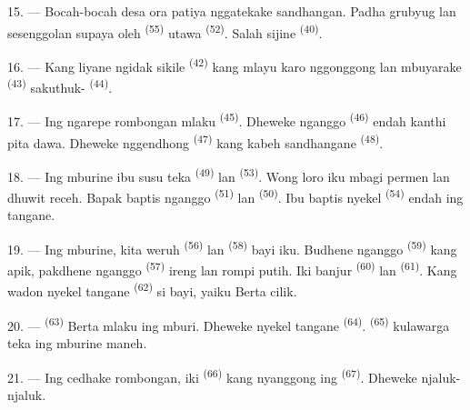 15. --- Bocah-bocah desa ora patiya nggatekake sandhangan. Padha
grubyug lan sesenggolan supaya oleh 
\textsuperscript{(55)} utawa  \textsuperscript{(52)}.
Salah sijine  \textsuperscript{(40)}.

16. --- Kang liyane ngidak sikile  \textsuperscript{(42)}
kang mlayu karo nggonggong lan mbuyarake 
\textsuperscript{(43)} sakuthuk- \textsuperscript{(44)}.

\VUsaut{5.0mm}
\VUsaut{4.0mm}

17. --- Ing ngarepe rombongan mlaku 
\textsuperscript{(45)}. Dheweke nganggo 
\textsuperscript{(46)} endah kanthi pita dawa. Dheweke nggendhong
 \textsuperscript{(47)} kang kabeh
sandhangane  \textsuperscript{(48)}.

18. --- Ing mburine ibu susu teka 
\textsuperscript{(49)} lan  \textsuperscript{(53)}.
Wong loro iku mbagi permen lan dhuwit receh. Bapak baptis nganggo
 \textsuperscript{(51)} lan  \textsuperscript{(50)}. Ibu baptis nyekel  \textsuperscript{(54)} endah ing tangane.

19. --- Ing mburine, kita weruh  \textsuperscript{(56)}
lan  \textsuperscript{(58)} bayi iku. Budhene nganggo
 \textsuperscript{(59)} kang apik, pakdhene nganggo
 \textsuperscript{(57)} ireng lan rompi putih. Iki
banjur  \textsuperscript{(60)} lan
 \textsuperscript{(61)}. Kang wadon nyekel
tangane  \textsuperscript{(62)} si bayi, yaiku
Berta cilik.

20. ---  \textsuperscript{(63)} Berta mlaku ing
mburi. Dheweke nyekel tangane 
\textsuperscript{(64)}.  \textsuperscript{(65)}
kulawarga teka ing mburine maneh.

\VUsaut{4.6mm}
\VUsaut{3.4mm}

21. --- Ing cedhake rombongan, iki 
\textsuperscript{(66)} kang nyanggong ing 
\textsuperscript{(67)}. Dheweke njaluk-njaluk.

